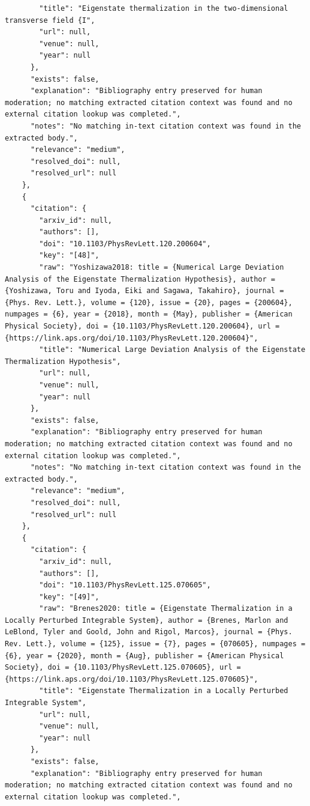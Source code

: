 \documentclass[11pt]{article}
\begin{document}
\begin{verbatim}
        "title": "Eigenstate thermalization in the two-dimensional transverse field {I",
        "url": null,
        "venue": null,
        "year": null
      },
      "exists": false,
      "explanation": "Bibliography entry preserved for human moderation; no matching extracted citation context was found and no external citation lookup was completed.",
      "notes": "No matching in-text citation context was found in the extracted body.",
      "relevance": "medium",
      "resolved_doi": null,
      "resolved_url": null
    },
    {
      "citation": {
        "arxiv_id": null,
        "authors": [],
        "doi": "10.1103/PhysRevLett.120.200604",
        "key": "[48]",
        "raw": "Yoshizawa2018: title = {Numerical Large Deviation Analysis of the Eigenstate Thermalization Hypothesis}, author = {Yoshizawa, Toru and Iyoda, Eiki and Sagawa, Takahiro}, journal = {Phys. Rev. Lett.}, volume = {120}, issue = {20}, pages = {200604}, numpages = {6}, year = {2018}, month = {May}, publisher = {American Physical Society}, doi = {10.1103/PhysRevLett.120.200604}, url = {https://link.aps.org/doi/10.1103/PhysRevLett.120.200604}",
        "title": "Numerical Large Deviation Analysis of the Eigenstate Thermalization Hypothesis",
        "url": null,
        "venue": null,
        "year": null
      },
      "exists": false,
      "explanation": "Bibliography entry preserved for human moderation; no matching extracted citation context was found and no external citation lookup was completed.",
      "notes": "No matching in-text citation context was found in the extracted body.",
      "relevance": "medium",
      "resolved_doi": null,
      "resolved_url": null
    },
    {
      "citation": {
        "arxiv_id": null,
        "authors": [],
        "doi": "10.1103/PhysRevLett.125.070605",
        "key": "[49]",
        "raw": "Brenes2020: title = {Eigenstate Thermalization in a Locally Perturbed Integrable System}, author = {Brenes, Marlon and LeBlond, Tyler and Goold, John and Rigol, Marcos}, journal = {Phys. Rev. Lett.}, volume = {125}, issue = {7}, pages = {070605}, numpages = {6}, year = {2020}, month = {Aug}, publisher = {American Physical Society}, doi = {10.1103/PhysRevLett.125.070605}, url = {https://link.aps.org/doi/10.1103/PhysRevLett.125.070605}",
        "title": "Eigenstate Thermalization in a Locally Perturbed Integrable System",
        "url": null,
        "venue": null,
        "year": null
      },
      "exists": false,
      "explanation": "Bibliography entry preserved for human moderation; no matching extracted citation context was found and no external citation lookup was completed.",

\end{verbatim}
\end{document}
